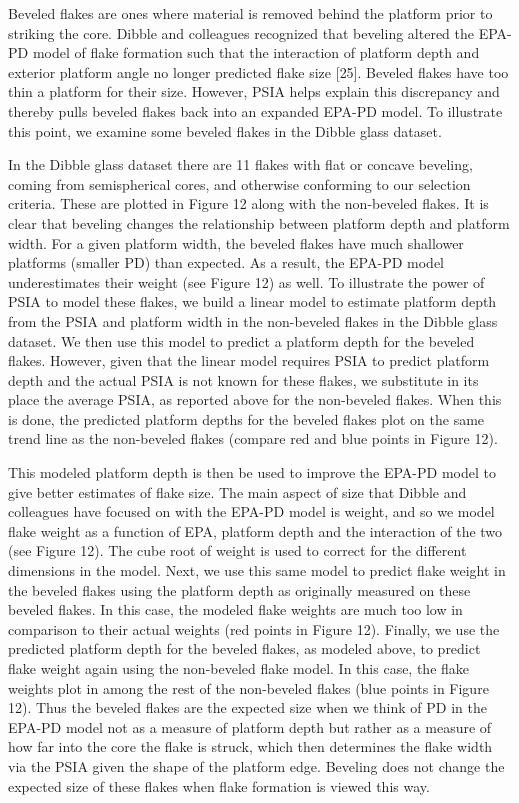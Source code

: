 \documentclass[10pt,letterpaper]{article}
\begin{document}
Beveled flakes are ones where material is removed behind the platform
prior to striking the core. Dibble and colleagues recognized that
beveling altered the EPA-PD model of flake formation such that the
interaction of platform depth and exterior platform angle no longer
predicted flake size {[}25{]}. Beveled flakes have too thin a platform
for their size. However, PSIA helps explain this discrepancy and thereby
pulls beveled flakes back into an expanded EPA-PD model. To illustrate
this point, we examine some beveled flakes in the Dibble glass dataset.

In the Dibble glass dataset there are 11 flakes with flat or concave
beveling, coming from semispherical cores, and otherwise conforming to
our selection criteria. These are plotted in Figure 12 along with the
non-beveled flakes. It is clear that beveling changes the relationship
between platform depth and platform width. For a given platform width,
the beveled flakes have much shallower platforms (smaller PD) than
expected. As a result, the EPA-PD model underestimates their weight (see
Figure 12) as well. To illustrate the power of PSIA to model these
flakes, we build a linear model to estimate platform depth from the PSIA
and platform width in the non-beveled flakes in the Dibble glass
dataset. We then use this model to predict a platform depth for the
beveled flakes. However, given that the linear model requires PSIA to
predict platform depth and the actual PSIA is not known for these
flakes, we substitute in its place the average PSIA, as reported above
for the non-beveled flakes. When this is done, the predicted platform
depths for the beveled flakes plot on the same trend line as the
non-beveled flakes (compare red and blue points in Figure 12).

This modeled platform depth is then be used to improve the EPA-PD model
to give better estimates of flake size. The main aspect of size that
Dibble and colleagues have focused on with the EPA-PD model is weight,
and so we model flake weight as a function of EPA, platform depth and
the interaction of the two (see Figure 12). The cube root of weight is
used to correct for the different dimensions in the model. Next, we use
this same model to predict flake weight in the beveled flakes using the
platform depth as originally measured on these beveled flakes. In this
case, the modeled flake weights are much too low in comparison to their
actual weights (red points in Figure 12). Finally, we use the predicted
platform depth for the beveled flakes, as modeled above, to predict
flake weight again using the non-beveled flake model. In this case, the
flake weights plot in among the rest of the non-beveled flakes (blue
points in Figure 12). Thus the beveled flakes are the expected size when
we think of PD in the EPA-PD model not as a measure of platform depth
but rather as a measure of how far into the core the flake is struck,
which then determines the flake width via the PSIA given the shape of
the platform edge. Beveling does not change the expected size of these
flakes when flake formation is viewed this way.
\end{document}
